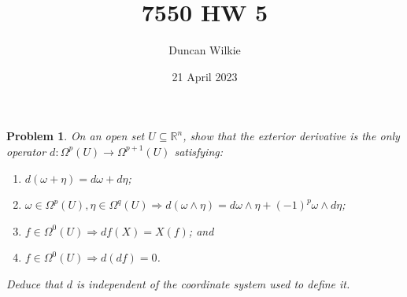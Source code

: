 \documentclass{article}
\title{7550 HW 5}
\author{Duncan Wilkie}
\date{21 April 2023}
\newtheorem{plm}{Problem}
\begin{document}
\maketitle

\begin{plm}
  On an open set $U \subseteq \mathbb{R}^{n}$, show that the exterior derivative is the only operator
  $d: \Omega^{p}(U) \to \Omega^{p+1}(U)$ satisfying:
  \begin{enumerate}
  \item $d(\omega + \eta) = d\omega + d\eta$;
  \item $\omega \in \Omega^{p}(U), \eta \in \Omega^{q}(U) \Rightarrow d(\omega \wedge \eta) = d\omega \wedge \eta+(-1)^p\omega\wedge d\eta$;
  \item $f \in \Omega^{0}(U) \Rightarrow df(X) = X(f)$; and
  \item $f \in \Omega^{0}(U) \Rightarrow d(df) = 0$.
  \end{enumerate}
  Deduce that $d$ is independent of the coordinate system used to define it.
\end{plm}
\end{document}
